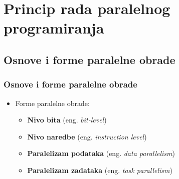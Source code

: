 \documentclass{beamer}
\begin{document}
	
	\section{Princip rada paralelnog programiranja}
	\subsection{Osnove i forme paralelne obrade}
	\begin{frame}[fragile]\frametitle{Osnove i forme paralelne obrade}
		\begin{itemize}	
			\item Forme paralelne obrade:
			\begin{itemize}
				\item \textbf{Nivo bita} (eng. \emph{bit-level})
				\item \textbf{Nivo naredbe} (eng. \emph{instruction level})
				\item \textbf{Paralelizam podataka} (eng. \emph{data parallelism})
				\item \textbf{Paralelizam zadataka} (eng. \emph{task parallelism})
			\end{itemize}
		\end{itemize}
		\begin{table}[h]
			\begin{center}
				\caption{Modeli izračunavanja efikasnosti paralelne obrade}
			\end{center}
		\end{table}
	\end{frame}
\end{document}
